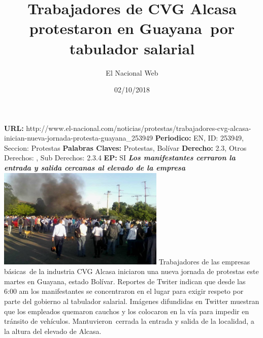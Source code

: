 \documentclass{article}%
\title{\textbf{Trabajadores de CVG Alcasa protestaron en Guayana~por tabulador salarial}}%
\author{El Nacional Web}%
\date{02/10/2018}%
\begin{document}
%
\normalsize%
\maketitle%
\textbf{URL: }%
http://www.el{-}nacional.com/noticias/protestas/trabajadores{-}cvg{-}alcasa{-}inician{-}nueva{-}jornada{-}protesta{-}guayana\_253949\newline%
%
\textbf{Periodico: }%
EN, %
ID: %
253949, %
Seccion: %
Protestas\newline%
%
\textbf{Palabras Claves: }%
Protestas, Bolívar\newline%
%
\textbf{Derecho: }%
2.3, %
Otros Derechos: %
, %
Sub Derechos: %
2.3.4\newline%
%
\textbf{EP: }%
SI\newline%
\newline%
%
\textbf{\textit{Los manifestantes cerraron la entrada y salida cercanas al elevado de la empresa}}%
\newline%
\newline%
%
\includegraphics[width=300px]{245.jpg}%
\newline%
%
Trabajadores de las empresas básicas~de la industria CVG Alcasa iniciaron una nueva jornada de protestas este martes en Guayana, estado Bolívar.%
\newline%
%
Reportes de Twiter indican que desde las 6:00 am los manifestantes se concentraron en el lugar para exigir respeto por parte del gobierno al tabulador salarial.%
\newline%
%
Imágenes difundidas en Twitter muestran que los empleados quemaron cauchos y los colocaron en la vía para impedir en tránsito de vehículos.%
\newline%
%
Mantuvieron~cerrada la entrada y salida de la localidad, a la altura del elevado de Alcasa.%
\newline%
%
\end{document}
